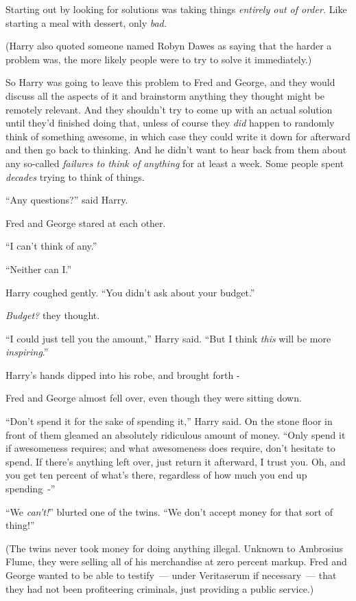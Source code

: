Starting out by looking for solutions was taking things \emph{entirely out of order.} Like starting a meal with dessert, only \emph{bad.}

(Harry also quoted someone named Robyn Dawes as saying that the harder a problem was, the more likely people were to try to solve it immediately.)

So Harry was going to leave this problem to Fred and George, and they would discuss all the aspects of it and brainstorm anything they thought might be remotely relevant. And they shouldn't try to come up with an actual solution until they'd finished doing that, unless of course they \emph{did} happen to randomly think of something awesome, in which case they could write it down for afterward and then go back to thinking. And he didn't want to hear back from them about any so-called \emph{failures to think of anything} for at least a week. Some people spent \emph{decades} trying to think of things.

``Any questions?'' said Harry.

Fred and George stared at each other.

``I can't think of any.''

``Neither can I.''

Harry coughed gently. ``You didn't ask about your budget.''

\emph{Budget?} they thought.

``I could just tell you the amount,'' Harry said. ``But I think \emph{this} will be more \emph{inspiring}.''

Harry's hands dipped into his robe, and brought forth -

Fred and George almost fell over, even though they were sitting down.

``Don't spend it for the sake of spending it,'' Harry said. On the stone floor in front of them gleamed an absolutely ridiculous amount of money. ``Only spend it if awesomeness requires; and what awesomeness does require, don't hesitate to spend. If there's anything left over, just return it afterward, I trust you. Oh, and you get ten percent of what's there, regardless of how much you end up spending~-''

``We \emph{can't!}'' blurted one of the twins. ``We don't accept money for that sort of thing!''

(The twins never took money for doing anything illegal. Unknown to Ambrosius Flume, they were selling all of his merchandise at zero percent markup. Fred and George wanted to be able to testify~--- under Veritaserum if necessary~--- that they had not been profiteering criminals, just providing a public service.)

